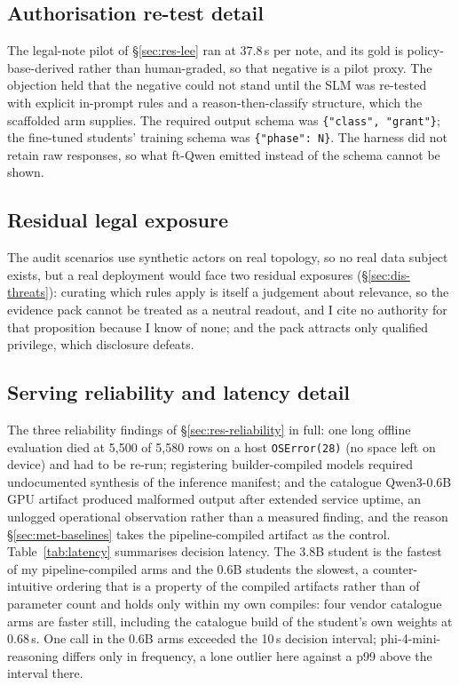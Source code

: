 \subsection{Authorisation re-test detail}\label{app:lee}
The legal-note pilot of \S\ref{sec:res-lee} ran at 37.8\,s per note, and
its gold is policy-base-derived rather than human-graded, so that negative
is a pilot proxy. The objection held that the negative could not stand
until the SLM was re-tested with explicit in-prompt rules and a
reason-then-classify structure, which the scaffolded arm supplies. The
required output schema was \texttt{\{"class", "grant"\}}; the fine-tuned
students' training schema was \texttt{\{"phase": N\}}. The harness did not
retain raw responses, so what ft-Qwen emitted instead of the schema cannot
be shown.

\subsection{Residual legal exposure}\label{app:legal}
The audit scenarios use synthetic actors on real topology, so no real data
subject exists, but a real deployment would face two residual exposures
(\S\ref{sec:dis-threats}): curating which rules apply is itself a
judgement about relevance, so the evidence pack cannot be treated as a
neutral readout, and I cite no authority for that proposition because I
know of none; and the pack attracts only qualified privilege, which
disclosure defeats.

\subsection{Serving reliability and latency detail}\label{app:serving}
The three reliability findings of \S\ref{sec:res-reliability} in full: one
long offline evaluation died at 5{,}500 of 5{,}580 rows on a host
\texttt{OSError(28)} (no space left on device) and had to be re-run;
registering builder-compiled models required undocumented synthesis of the
inference manifest; and the catalogue Qwen3-0.6B GPU artifact produced
malformed output after extended service uptime, an unlogged operational
observation rather than a measured finding, and the reason
\S\ref{sec:met-baselines} takes the pipeline-compiled artifact as the
control. Table~\ref{tab:latency} summarises decision latency. The 3.8B
student is the fastest of my pipeline-compiled arms and the 0.6B students
the slowest, a counter-intuitive ordering that is a property of the
compiled artifacts rather than of parameter count and holds only within my
own compiles: four vendor catalogue arms are faster still, including the
catalogue build of the student's own weights at 0.68\,s. One call in the
0.6B arms exceeded the 10\,s decision interval; phi-4-mini-reasoning
differs only in frequency, a lone outlier here against a p99 above the
interval there.
